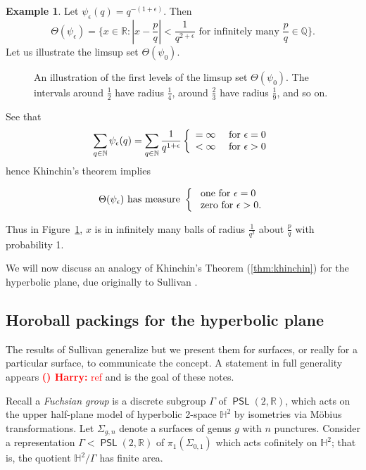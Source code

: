 \documentclass[11pt]{amsart}
\theoremstyle{plain}
\theoremstyle{definition}
\newtheorem{example}[proposition]{Example}
\theoremstyle{remark}
\DeclareMathOperator{\PSL}{\mathsf{PSL}}
\newcounter{countharry}
\newcommand{\comharry}[1]{{\textcolor{red}{\textrm{{\bf (\arabic{countharry})\stepcounter{countharry} Harry:} #1}}}}
\begin{document}
\begin{example}
  Let $\psi_\epsilon(q)=q^{-(1+\epsilon)}$. Then 
  \[
    \Theta(\psi_\epsilon)=\{
      x\in\mathbb R :
      |x-\frac{p}q|<\frac1{q^{2+\epsilon}}
      \text{ 
	for infinitely many
      }\frac{p}q\in\mathbb Q
    \}.
  \]
  Let us illustrate the limsup set $\Theta(\psi_0)$. 

  \begin{figure}[h!]
    \centering
    
    \caption{
      An illustration of the first levels of the limsup set
      $\Theta(\psi_0)$. The intervals around $\frac12$ have radius $\frac14$,
      around $\frac23$ have radius $\frac19$, and so on.
    }
    \label{fig:khinchin}
  \end{figure}

  See that 
  \[
    \sum_{q\in\mathbb N}\psi_\epsilon(q)=\sum_{q\in\mathbb
    N}\frac1{q^{1+\epsilon}}
     \left\{
      \begin{array}[]{cc}
	=\infty & \text{ for }\epsilon=0\\
	<\infty & \text{ for }\epsilon>0
      \end{array}
    \right.
  \]
  hence
  Khinchin's theorem implies 

  \[
    \Theta(\psi_\epsilon) \text{ has measure }
    \left\{
      \begin{array}[]{l}
	\text{  one for }\epsilon=0 \\
	\text{  zero for }\epsilon>0.
      \end{array}
    \right.
  \]

  Thus in Figure~\ref{fig:khinchin}, $x$ is in infinitely many balls of radius
  $\frac1{q^2}$ about $\frac{p}q$ with probability 1. 

\end{example}

We will now discuss an analogy of Khinchin's Theorem (\ref{thm:khinchin})
for the hyperbolic plane, due originally to Sullivan \cite{sullivan84}.


\subsection{Horoball packings for the hyperbolic plane} 

The results of Sullivan generalize but we present them for surfaces, or
really for a particular surface, to communicate the concept. A statement
in full generality appears \comharry{ref} and is the goal of these notes. 

Recall a { \em  Fuchsian group} is a discrete subgroup $\Gamma$ of $\PSL(2,\mathbb
R)$, which acts on the upper half-plane model of hyperbolic 2-space
$\mathbb H^2$ by isometries via M\"obius transformations. Let
$\Sigma_{g,n}$ denote a surfaces of genus $g$ with $n$ punctures. Consider a
representation $\Gamma<\PSL(2,\mathbb R)$ of $\pi_1(\Sigma_{0,1})$ which
acts cofinitely on $\mathbb H^2$; that is, the quotient $\mathbb
H^2/\Gamma$ has finite area. 












\end{document}
